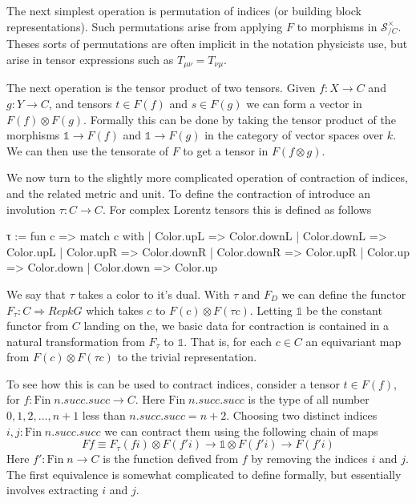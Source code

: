 \documentclass[a4paper, 11pt]{article}
\begin{document}
The next simplest operation is permutation of indices (or building block representations).
Such permutations arise from applying $F$ to morphisms in $\mathcal{S}_{/C}^\times$. 
Theses sorts of permutations are often implicit in the notation physicists use, but arise 
in tensor expressions such as $T_{\mu \nu} = T_{\nu \mu}$.

The next operation is the tensor product of two tensors. Given $f : X \to C$ and
$g : Y \to C$, and tensors $t \in F(f)$ and $s \in F(g)$ we can form a vector in 
$F(f) \otimes F(g)$. Formally this can be done by taking the tensor product of the morphisms
$\mathbb{1} \to F(f)$ and $\mathbb{1} \to F(g)$ in the category of vector spaces over $k$.
We can then use the tensorate of $F$ to get a tensor in $F(f \otimes g)$.

We now turn to the slightly more complicated operation of contraction of indices, 
and the related metric and unit. 
To define the contraction of introduce an involution $\tau : C \to C$. For complex Lorentz tensors
this is defined as follows
\begin{code} 
  τ := fun c =>
    match c with
    | Color.upL => Color.downL
    | Color.downL => Color.upL
    | Color.upR => Color.downR
    | Color.downR => Color.upR
    | Color.up => Color.down
    | Color.down => Color.up
\end{code}
We say that $\tau$ takes a color to it's dual. With $\tau$ and $F_D$ we can define 
the functor  $F_\tau : C \Rightarrow Rep k G$ which takes $c$ to $F(c) \otimes F(\tau c)$. 
Letting $\mathbb{1}$ be the constant functor from $C$ landing on the, we basic data 
for contraction is contained in a natural transformation from $F_\tau$ to $\mathbb{1}$.
That is, for each $c \in C$ an equivariant map from $F(c) \otimes F(\tau c)$ to the trivial 
representation. 

To see how this is can be used to contract indices, consider a tensor $t \in F(f)$, 
for $f : \mathrm{Fin} \; n.succ.succ \to C$. Here $\mathrm{Fin} \; n.succ.succ$ is the type 
of all number ${0, 1, 2, \ldots, n+1}$ less than $n.succ.succ = n + 2$. 
Choosing two distinct indices $i, j : \mathrm{Fin} \; n.succ.succ$ we can contract them 
using the following chain of maps
\begin{equation}
  F f \equiv F_\tau (f i) \otimes F (f' i) \to \mathbb{1} \otimes F (f' i) \to F (f' i)
\end{equation}
Here $f' : \mathrm{Fin} \; n \to C$ is the function defived from $f$ by removing the indices $i$ 
and $j$. The first equivalence is somewhat complicated to define formally, but essentially involves 
extracting $i$ and $j$. 
\end{document}
